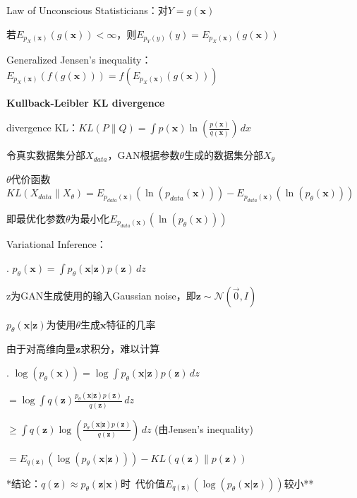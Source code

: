 \documentclass[UTF8]{ctexart}
\begin{document}
  \quad Law of Unconscious Statisticians：对$Y = g(\mathbf{x})$
  
  \quad \quad 若$E_{p_X(\mathbf{x})}(g(\mathbf{x})) < \infty$，则$E_{p_Y(y)}(y) = E_{p_X(\mathbf{x})}(g(\mathbf{x}))$

  \quad Generalized Jensen's inequality：$E_{p_X(\mathbf{x})}(f(g(\mathbf{x}))) = f(E_{p_X(\mathbf{x})}(g(\mathbf{x})))$

  \textbf{Kullback-Leibler KL divergence}

  \quad divergence KL：$KL(P \| Q) = \int p(\mathbf{x})\ln(\frac{p(\mathbf{x})}{q(\mathbf{x})}) \,dx $

  \quad 令真实数据集分部$X_{data}$，GAN根据参数$\theta$生成的数据集分部$X_{\theta}$
  
  \quad $\theta$代价函数$KL(X_{data} \| X_{\theta}) = E_{p_{data}(\mathbf{x})}(\ln(p_{data}(\mathbf{x}))) - E_{p_{data}(\mathbf{x})}(\ln(p_{\theta}(\mathbf{x})))$

  \quad \quad 即最优化参数$\theta$为最小化$E_{p_{data}(\mathbf{x})}(\ln(p_{\theta}(\mathbf{x})))$

  \quad Variational Inference：

  \quad {}. $p_{\theta}(\mathbf{x}) = \int p_{\theta}(\mathbf{x} | \mathbf{z})p(\mathbf{z}) \,dz $

  \quad \quad \quad z为GAN生成使用的输入Gaussian noise，即$\mathbf{z} \sim \mathcal{N}(\vec{0}, I)$

  \quad \quad \quad $p_{\theta}(\mathbf{x} | \mathbf{z})$为使用$\theta$生成$\mathbf{x}$特征的几率

  \quad \quad \quad 由于对高维向量$\mathbf{z}$求积分，难以计算

  \quad {}. $\log(p_{\theta}(\mathbf{x})) = \log\int p_{\theta}(\mathbf{x} | \mathbf{z})p(\mathbf{z}) \,dz $

  \quad \quad \quad $ = \log\int q(\mathbf{z})\frac{p_{\theta}(\mathbf{x} | \mathbf{z})p(\mathbf{z})}{q(\mathbf{z})} \,dz $

  \quad \quad \quad $ \geq \int q(\mathbf{z})\log(\frac{p_{\theta}(\mathbf{x} | \mathbf{z})p(\mathbf{z})}{q(\mathbf{z})}) \,dz $ (由Jensen's inequality)

  \quad \quad \quad $ = E_{q(\mathbf{z})}(\log(p_{\theta}(\mathbf{x} | \mathbf{z}))) - KL(q(\mathbf{z})\|p(\mathbf{z})) $

  \quad \quad **结论：$q(\mathbf{z}) \approx p_{\theta}(\mathbf{z} | \mathbf{x})$时\ 代价值$E_{q(\mathbf{z})}(\log(p_{\theta}(\mathbf{x} | \mathbf{z})))$较小**
\end{document}
